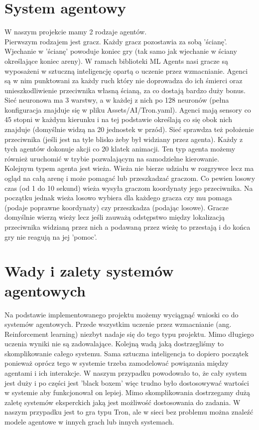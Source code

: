 \documentclass[12pt,a4paper]{article}
\begin{document}
\section{System agentowy}
W naszym projekcie mamy 2 rodzaje agentów.\\
Pierwszym rodzajem jest gracz. Każdy gracz pozostawia za sobą 'ścianę'. Wjechanie w 'ścianę' powoduje koniec gry (tak samo jak wjechanie w ściany określające koniec areny). W ramach biblioteki ML Agents nasi gracze są wyposażeni w sztuczną inteligencję opartą o uczenie przez wzmacnianie. Agenci są w nim punktowani za każdy ruch który nie doprowadza do ich śmierci oraz unieszkodliwienie przeciwnika własną ścianą, za co dostają bardzo duży bonus. Sieć neuronowa ma 3 warstwy, a w każdej z nich po 128 neuronów (pełna konfiguracja znajduje się w pliku Assets/AI/Tron.yaml). Agenci mają sensory co 45 stopni w każdym kierunku i na tej podstawie określają co się obok nich znajduje (domyślnie widzą na 20 jednostek w przód). Sieć sprawdza też położenie przeciwnika (jeśli jest na tyle blisko żeby był widziany przez agenta). Każdy z tych agentów dokonuje akcji co 20 klatek animacji. Ten typ agenta możemy również uruchomić w trybie pozwalającym na samodzielne kierowanie.\\
Kolejnym typem agenta jest wieża. Wieża nie bierze udziału w rozgrywce lecz ma ogląd na całą arenę i może pomagać lub przeszkadzać graczom. Co pewien losowy czas (od 1 do 10 sekund) wieża wysyła graczom koordynaty jego przeciwnika. Na początku jednak wieża losowo wybiera dla każdego gracza czy mu pomaga (podaje poprawne koordynaty) czy przeszkadza (podając losowe). Gracze domyślnie wierzą wieży lecz jeśli zauważą odstępstwo między lokalizacją przeciwnika widzianą przez nich a podawaną przez wieżę to przestają i do końca gry nie reagują na jej 'pomoc'.




\section{Wady i zalety systemów agentowych}
Na podstawie implementowanego projektu możemy wyciągnąć wnioski co do systemów agentowych. Przede wszystkim uczenie przez wzmacnianie (ang. Reinforcement learning) niezbyt nadaje się do tego typu projektu. Mimo długiego uczenia wyniki nie są zadowalające. Kolejną wadą jaką dostrzegliśmy to skomplikowanie całego systemu. Sama sztuczna inteligencja to dopiero początek ponieważ oprócz tego w systemie trzeba zamodelować powiązania między agentami i ich interakcje. W naszym przypadku powodowało to, że cały system jest duży i po części jest 'black boxem' więc trudno było dostosowywać wartości w systemie aby funkcjonował on lepiej. Mimo skomplikowania dostrzegamy dużą zaletę systemów eksperckich jaką jest możliwość dostosowania do zadania. W naszym przypadku jest to gra typu Tron, ale w sieci bez problemu można znaleźć modele agentowe w innych grach lub innych systemach. 
\end{document}

